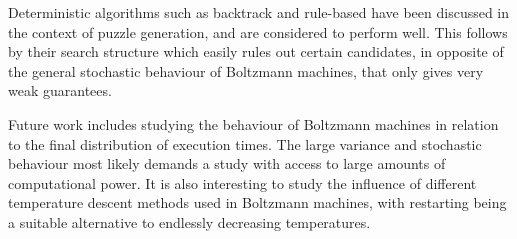 \documentclass[a4paper,11pt]{kth-mag}
\begin{document}
Deterministic algorithms such as backtrack and rule-based have been discussed in the context of puzzle generation, and are considered to perform well.
This follows by their search structure which easily rules out certain candidates, in opposite of the general stochastic behaviour of Boltzmann machines, that only gives very weak guarantees.

Future work includes studying the behaviour of Boltzmann machines in relation to the final distribution of execution times.
The large variance and stochastic behaviour most likely demands a study with access to large amounts of computational power.
It is also interesting to study the influence of different temperature descent methods used in Boltzmann machines, with restarting being a suitable alternative to endlessly decreasing temperatures.
\end{document}
